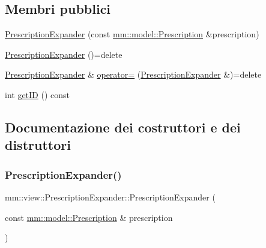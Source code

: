 \subsection*{Membri pubblici}
\begin{DoxyCompactItemize}
\item 
\hyperlink{classmm_1_1view_1_1_prescription_expander_a12b5e974972ebdd42478c59c08e3f219}{Prescription\+Expander} (const \hyperlink{classmm_1_1model_1_1_prescription}{mm\+::model\+::\+Prescription} \&prescription)
\item 
\hyperlink{classmm_1_1view_1_1_prescription_expander_ac39b2410139956ef3f707caf1b23dc26}{Prescription\+Expander} ()=delete
\item 
\hyperlink{classmm_1_1view_1_1_prescription_expander}{Prescription\+Expander} \& \hyperlink{classmm_1_1view_1_1_prescription_expander_a21d6e2894f4c17fc279510f4fadd8eff}{operator=} (\hyperlink{classmm_1_1view_1_1_prescription_expander}{Prescription\+Expander} \&)=delete
\item 
int \hyperlink{classmm_1_1view_1_1_prescription_expander_a63f5113e028e8d9e7eb09981dc28e602}{get\+ID} () const
\end{DoxyCompactItemize}


\subsection{Documentazione dei costruttori e dei distruttori}
\mbox{\label{classmm_1_1view_1_1_prescription_expander_a12b5e974972ebdd42478c59c08e3f219}} 
\subsubsection{\texorpdfstring{Prescription\+Expander()}{PrescriptionExpander()}\hspace{0.1cm}{\footnotesize\ttfamily [1/2]}}
{\footnotesize\ttfamily mm\+::view\+::\+Prescription\+Expander\+::\+Prescription\+Expander (\begin{DoxyParamCaption}\item[{const \hyperlink{classmm_1_1model_1_1_prescription}{mm\+::model\+::\+Prescription} \&}]{prescription }\end{DoxyParamCaption})}

